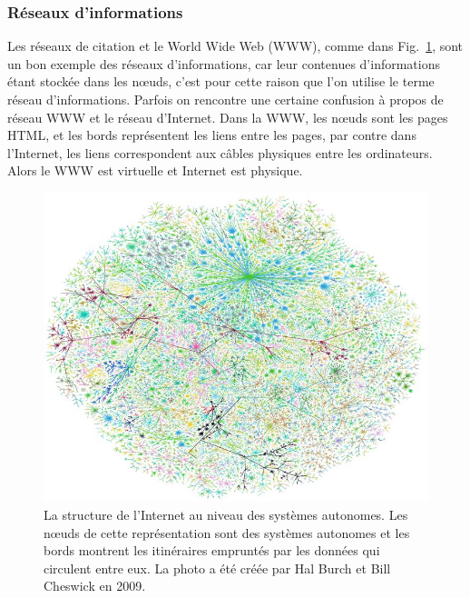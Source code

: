   \subsubsection{Réseaux d'informations}        
 Les  réseaux de citation et le World Wide Web (WWW), comme dans Fig.~\ref{WWW}, sont un bon exemple des réseaux d'informations, car leur contenues d'informations étant stockée dans les nœuds, c’est pour cette raison que l’on utilise le terme réseau d’informations. Parfois on rencontre une certaine confusion à propos de réseau  WWW  et le réseau d'Internet. Dans la WWW, les nœuds sont les pages HTML, et les bords représentent les liens entre les pages, par contre  dans l'Internet, les liens correspondent aux câbles physiques entre les ordinateurs. Alors  le WWW est virtuelle et Internet est physique.
\begin{figure}[h!]
	\centering
	\includegraphics[scale=0.3]{./figures/www2}
	\caption{La structure de l'Internet au niveau des systèmes autonomes. Les nœuds de cette représentation sont des systèmes autonomes et les bords montrent les itinéraires empruntés par les données qui circulent entre eux. La photo a été créée par Hal Burch et Bill Cheswick en 2009.}
	\label{WWW}
\end{figure}

